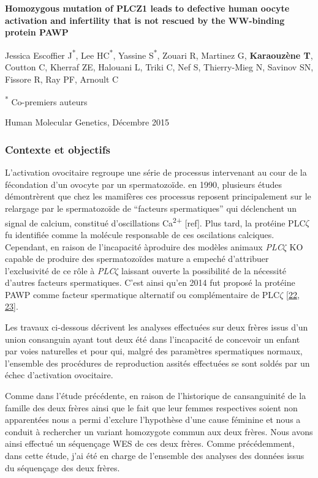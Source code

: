 \documentclass[12pt,twoside]{reedthesis}
\theoremstyle{definition}
\theoremstyle{definition}
\theoremstyle{remark}
\begin{document}
  \textbf{Homozygous mutation of PLCZ1 leads to defective human oocyte
  activation and infertility that is not rescued by the WW-binding protein
  PAWP}
  
  Jessica Escoffier J\textsuperscript{*}, Lee HC\textsuperscript{*},
  Yassine S\textsuperscript{*}, Zouari R, Martinez G, \textbf{Karaouzène
  T}, Coutton C, Kherraf ZE, Halouani L, Triki C, Nef S, Thierry-Mieg N,
  Savinov SN, Fissore R, Ray PF, Arnoult C
  
  \textsuperscript{*} Co-premiers auteurs
  
  Human Molecular Genetics, Décembre 2015
  
  \newpage
  
  \subsubsection{Contexte et objectifs}\label{contexte-et-objectifs-1}
  
  L'activation ovocitaire regroupe une série de processus intervenant au
  cour de la fécondation d'un ovocyte par un spermatozoïde. en 1990,
  plusieurs études démontrèrent que chez les mamifères ces processus
  reposent principalement sur le relargage par le spermatozoïde de
  ``facteurs spermatiques'' qui déclenchent un signal de calcium,
  constitué d'oscillations Ca\textsuperscript{2+} {[}ref{]}. Plus tard, la
  protéine PLC\(\zeta\) fu identifiée comme la molécule responsable de ces
  oscilations calciques. Cependant, en raison de l'incapacité àproduire
  des modèles animaux \emph{PLC}\(\zeta\) KO capable de produire des
  spermatozoïdes mature a empeché d'attribuer l'exclusivité de ce rôle à
  \emph{PLC}\(\zeta\) laissant ouverte la possibilité de la nécessité
  d'autres facteurs spermatiques. C'est ainsi qu'en 2014 fut proposé la
  protéine PAWP comme facteur spermatique alternatif ou complémentaire de
  PLC\(\zeta\) {[}\protect\hyperlink{ref-Aarabi2014}{22},
  \protect\hyperlink{ref-Aarabi2014a}{23}{]}.
  
  Les travaux ci-dessous décrivent les analyses effectuées sur deux frères
  issus d'un union consanguin ayant tout deux été dans l'incapacité de
  concevoir un enfant par voies naturelles et pour qui, malgré des
  paramètres spermatiques normaux, l'ensemble des procédures de
  reproduction assités effectuées se sont soldés par un échec d'activation
  ovocitaire.
  
  Comme dans l'étude précédente, en raison de l'historique de
  cansanguinité de la famille des deux frères ainsi que le fait que leur
  femmes respectives soient non apparentées nous a permi d'exclure
  l'hypothèse d'une cause féminine et nous a conduit à rechercher un
  variant homozygote commun aux deux frères. Nous avons ainsi effectué un
  séquençage WES de ces deux frères. Comme précédemment, dans cette étude,
  j'ai été en charge de l'ensemble des analyses des données issus du
  séquençage des deux frères.
  
\end{document}
